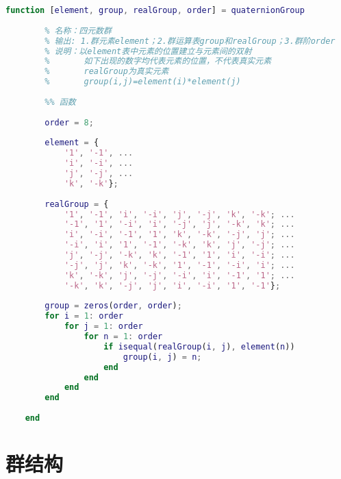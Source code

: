 \begin{lstlisting}[language=Matlab, caption={四元数群}, label={quaternionGroup}]
	function [element, group, realGroup, order] = quaternionGroup
	
	    % 名称：四元数群
	    % 输出: 1.群元素element；2.群运算表group和realGroup；3.群阶order
	    % 说明：以element表中元素的位置建立与元素间的双射
	    %       如下出现的数字均代表元素的位置，不代表真实元素
	    %       realGroup为真实元素
	    %       group(i,j)=element(i)*element(j)
	
	    %% 函数
	
	    order = 8;
	
	    element = {
	        '1', '-1', ...
	        'i', '-i', ...
	        'j', '-j', ...
	        'k', '-k'};
	
	    realGroup = {
	        '1', '-1', 'i', '-i', 'j', '-j', 'k', '-k'; ...
	        '-1', '1', '-i', 'i', '-j', 'j', '-k', 'k'; ...
	        'i', '-i', '-1', '1', 'k', '-k', '-j', 'j'; ...
	        '-i', 'i', '1', '-1', '-k', 'k', 'j', '-j'; ...
	        'j', '-j', '-k', 'k', '-1', '1', 'i', '-i'; ...
	        '-j', 'j', 'k', '-k', '1', '-1', '-i', 'i'; ...
	        'k', '-k', 'j', '-j', '-i', 'i', '-1', '1'; ...
	        '-k', 'k', '-j', 'j', 'i', '-i', '1', '-1'};
	
	    group = zeros(order, order);
	    for i = 1: order
	        for j = 1: order
	            for n = 1: order
	                if isequal(realGroup(i, j), element(n))
	                    group(i, j) = n;
	                end
	            end
	        end
	    end
	
	end
\end{lstlisting}

\section{群结构}

